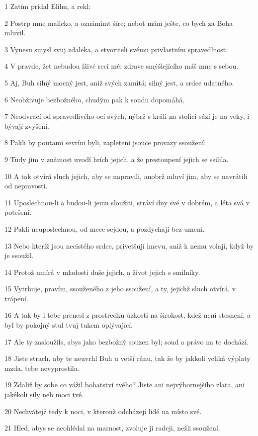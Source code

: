 \par 1 Zatím pridal Elihu, a rekl:
\par 2 Postrp mne malicko, a oznámímt šíre; nebot mám ješte, co bych za Boha mluvil.
\par 3 Vynesu smysl svuj zdaleka, a stvoriteli svému privlastním spravedlnost.
\par 4 V pravde, žet nebudou lživé reci mé; zdrave smýšlejícího máš mne s sebou.
\par 5 Aj, Buh silný mocný jest, aniž svých zamítá; silný jest, a srdce udatného.
\par 6 Neobživuje bezbožného, chudým pak k soudu dopomáhá.
\par 7 Neodvrací od spravedlivého ocí svých, nýbrž s králi na stolici sází je na veky, i bývají zvýšeni.
\par 8 Pakli by poutami sevríni byli, zapleteni jsouce provazy ssoužení:
\par 9 Tudy jim v známost uvodí hrích jejich, a že prestoupení jejich se ssilila.
\par 10 A tak otvírá sluch jejich, aby se napravili, anobrž mluví jim, aby se navrátili od nepravosti.
\par 11 Uposlechnou-li a budou-li jemu sloužiti, stráví dny své v dobrém, a léta svá v potešení.
\par 12 Pakli neuposlechnou, od mece sejdou, a pozdychají bez umení.
\par 13 Nebo kteríž jsou necistého srdce, privetšují hnevu, aniž k nemu volají, když by je ssoužil.
\par 14 Protož umírá v mladosti duše jejich, a život jejich s smilníky.
\par 15 Vytrhuje, pravím, ssouženého z jeho ssoužení, a ty, jejichž sluch otvírá, v trápení.
\par 16 A tak by i tebe prenesl z prostredku úzkosti na širokost, kdež není stesnení, a byl by pokojný stul tvuj tukem oplývající.
\par 17 Ale ty zasloužils, abys jako bezbožný souzen byl; soud a právo na te dochází.
\par 18 Jiste strach, aby te neuvrhl Buh u vetší ránu, tak že by jakkoli veliká výplaty mzda, tebe nevyprostila.
\par 19 Zdaliž by sobe co vážil bohatství tvého? Jiste ani nejvýbornejšího zlata, ani jakékoli síly neb moci tvé.
\par 20 Nechvátejž tedy k noci, v kterouž odcházejí lidé na místo své.
\par 21 Hled, abys se neohlédal na marnost, zvoluje ji radeji, nežli ssoužení.
